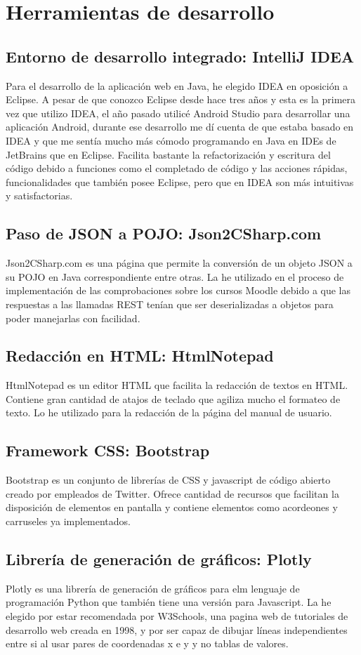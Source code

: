 \section{Herramientas de desarrollo}
\subsection{Entorno de desarrollo integrado: IntelliJ IDEA}
Para el desarrollo de la aplicación web en Java, he elegido IDEA en oposición a Eclipse.
A pesar de que conozco Eclipse desde hace tres años y esta es la primera vez que utilizo IDEA, el año pasado utilicé Android Studio para desarrollar una aplicación Android, durante ese desarrollo me dí cuenta de que estaba basado en IDEA y que me sentía mucho más cómodo programando en Java en IDEs de JetBrains que en Eclipse. Facilita bastante la refactorización y escritura del código debido a funciones como el completado de código y las acciones rápidas, funcionalidades que también posee Eclipse, pero que en IDEA son más intuitivas y satisfactorias.
\subsection{Paso de JSON a POJO: Json2CSharp.com}
Json2CSharp.com es una página que permite la conversión de un objeto JSON a su POJO en Java correspondiente entre otras. La he utilizado en el proceso de implementación de las comprobaciones sobre los cursos Moodle debido a que las respuestas a las llamadas REST tenían que ser deserializadas a objetos para poder manejarlas con facilidad.
\subsection{Redacción en HTML: HtmlNotepad}
HtmlNotepad es un editor HTML que facilita la redacción de textos en HTML. Contiene gran cantidad de atajos de teclado que agiliza mucho el formateo de texto. Lo he utilizado para la redacción de la página del manual de usuario.
\subsection{Framework CSS: Bootstrap}
Bootstrap es un conjunto de librerías de CSS y javascript de código abierto creado por empleados de Twitter. Ofrece cantidad de recursos que facilitan la disposición de elementos en pantalla y contiene elementos como acordeones y carruseles ya implementados.
\subsection{Librería de generación de gráficos: Plotly}
Plotly es una librería de generación de gráficos para elm lenguaje de programación Python que también tiene una versión para Javascript. La he elegido por estar recomendada por W3Schools, una pagina web de tutoriales de desarrollo web creada en 1998, y por ser capaz de dibujar líneas independientes entre si al usar pares de coordenadas x e y y no tablas de valores.




